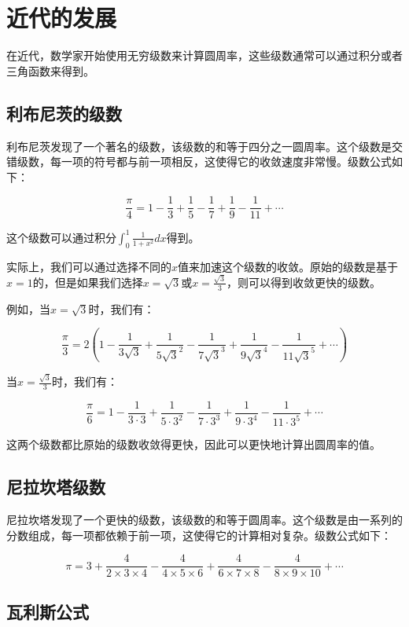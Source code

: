 \documentclass{ctexart}
\begin{document}
\section{近代的发展}

在近代，数学家开始使用无穷级数来计算圆周率，这些级数通常可以通过积分或者三角函数来得到。

\subsection{利布尼茨的级数}

利布尼茨发现了一个著名的级数，该级数的和等于四分之一圆周率。这个级数是交错级数，每一项的符号都与前一项相反，这使得它的收敛速度非常慢。级数公式如下：

\[
    \frac{\pi}{4} = 1 - \frac{1}{3} + \frac{1}{5} - \frac{1}{7} + \frac{1}{9} - \frac{1}{11} + \cdots
\]

这个级数可以通过积分$\int_0^1 \frac{1}{1+x^2} dx$得到\cite{leibniz}。

实际上，我们可以通过选择不同的$x$值来加速这个级数的收敛。原始的级数是基于$x=1$的，但是如果我们选择$x=\sqrt{3}$或$x=\frac{\sqrt{3}}{3}$，则可以得到收敛更快的级数。

例如，当$x=\sqrt{3}$时，我们有：

\[
    \frac{\pi}{3} = 2\left(1 - \frac{1}{3\sqrt{3}} + \frac{1}{5\sqrt{3}^2} - \frac{1}{7\sqrt{3}^3} + \frac{1}{9\sqrt{3}^4} - \frac{1}{11\sqrt{3}^5} + \cdots\right)
\]

当$x=\frac{\sqrt{3}}{3}$时，我们有：

\[
    \frac{\pi}{6} = 1 - \frac{1}{3\cdot3} + \frac{1}{5\cdot3^2} - \frac{1}{7\cdot3^3} + \frac{1}{9\cdot3^4} - \frac{1}{11\cdot3^5} + \cdots
\]

这两个级数都比原始的级数收敛得更快，因此可以更快地计算出圆周率的值。

\subsection{尼拉坎塔级数}

尼拉坎塔发现了一个更快的级数，该级数的和等于圆周率。这个级数是由一系列的分数组成，每一项都依赖于前一项，这使得它的计算相对复杂\cite{nilakantha}。级数公式如下：

\[
    \pi = 3 + \frac{4}{2\times3\times4} - \frac{4}{4\times5\times6} + \frac{4}{6\times7\times8} - \frac{4}{8\times9\times10} + \cdots
\]


\subsection{瓦利斯公式}
\end{document}
